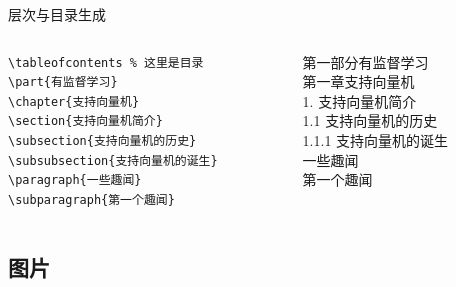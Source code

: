 \begin{frame}[fragile]{层次与目录生成}
    \begin{columns}
        \begin{column}{0.4\textwidth}
            \begin{verbatim}
\tableofcontents % 这里是目录
\part{有监督学习}
\chapter{支持向量机}
\section{支持向量机简介}
\subsection{支持向量机的历史}
\subsubsection{支持向量机的诞生}
\paragraph{一些趣闻}
\subparagraph{第一个趣闻}
            \end{verbatim}
        \end{column}
        \begin{column}{0.4\textwidth}
            第一部分\quad 有监督学习\\
            第一章\quad 支持向量机 \\
            1. 支持向量机简介 \\
            1.1 支持向量机的历史 \\
            1.1.1 支持向量机的诞生 \\
            一些趣闻  \\
            第一个趣闻
        \end{column}
    \end{columns}
\end{frame}

\subsection{图片}

